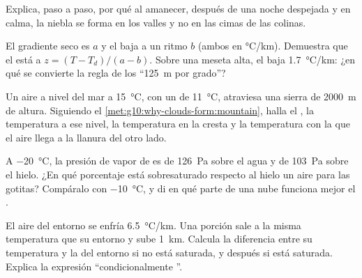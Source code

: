 \begin{exercise}[$\star\star$]\label{exo:g10:why-clouds-form:11}
Explica, paso a paso, por qué al amanecer, después de una noche despejada y
en calma, la niebla se forma en los valles y no en las cimas de las colinas.
\end{exercise}

\begin{exercise}[$\star\star\star$]\label{exo:g10:why-clouds-form:12}
El gradiente seco es $a$ y el  baja a un ritmo $b$ (ambos en
\unit{\degreeCelsius/km}). Demuestra que el  está a
$z = (T - T_d)/(a - b)$. Sobre una meseta alta, el  baja
\qty{1.7}{\degreeCelsius/km}: ¿en qué se convierte la regla de los
``\qty{125}{m} por grado''?
\end{exercise}

\begin{exercise}[$\star\star\star$]\label{exo:g10:why-clouds-form:13}
Un aire a nivel del mar a \qty{15}{\degreeCelsius}, con un  de
\qty{11}{\degreeCelsius}, atraviesa una sierra de \qty{2000}{m} de altura.
Siguiendo el \cref{met:g10:why-clouds-form:mountain}, halla el , la temperatura a ese nivel, la temperatura en la cresta y la
temperatura con la que el aire llega a la llanura del otro lado.
\end{exercise}

\begin{exercise}[$\star\star\star$]\label{exo:g10:why-clouds-form:14}
A \qty{-20}{\degreeCelsius}, la presión de vapor de  es de
\qty{126}{Pa} sobre el agua y de \qty{103}{Pa} sobre el hielo. ¿En qué
porcentaje está sobresaturado respecto al hielo un aire  para las
gotitas? Compáralo con \qty{-10}{\degreeCelsius}, y di en qué parte de una
nube funciona mejor el .
\end{exercise}

\begin{exercise}[$\star\star\star$]\label{exo:g10:why-clouds-form:15}
El aire del entorno se enfría \qty{6.5}{\degreeCelsius/km}. Una porción sale
a la misma temperatura que su entorno y sube \qty{1}{km}. Calcula la
diferencia entre su temperatura y la del entorno si no está saturada, y
después si está saturada. Explica la expresión ``condicionalmente
''.
\end{exercise}

